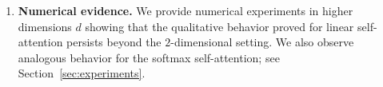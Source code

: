 \documentclass[10pt]{article}
\theoremstyle{definition}
\theoremstyle{definition}
\numberwithin{equation}{section}
\begin{document}
\begin{enumerate}[label=\textup{(\roman*)}]
    \item \textbf{Numerical evidence.}
    We provide numerical experiments in higher dimensions $d$ showing that the
    qualitative behavior proved for linear self-attention persists beyond the
    $2$-dimensional setting. We also observe analogous behavior for the softmax self-attention;
    see Section~\ref{sec:experiments}.
\end{enumerate}










\end{document}
